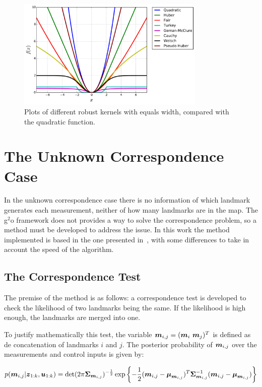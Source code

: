 \begin{figure}[htbp!]
    \centering
    \includegraphics[width=0.8\textwidth]{imagenes/kernels.pdf}
    \caption[Plots of different kernels.]{Plots of different robust kernels with equals width, compared with the quadratic function.}
    \label{fig:kernels}
\end{figure}

\section{The Unknown Correspondence Case}

In the unknown correspondence case there is no information of which landmark generates each measurement, neither of how many landmarks are in the map. The g$^2$o framework does not provides a way to solve the correspondence problem, so a method must be developed to address the issue. In this work the method implemented is based in the one presented in~\cite{graphslam}, with some differences to take in account the speed of the algorithm. 

\subsection{The Correspondence Test}

The premise of the method is as follows: a correspondence test is developed to check the likelihood of two landmarks being the same. If the likelihood is high enough, the landmarks are merged into one. 

To justify mathematically this test, the variable $\boldsymbol{m}_{i,j}=(\boldsymbol{m}_i~ \boldsymbol{m}_j)^T$ is defined as de concatenation of landmarks $i$ and $j$. The posterior probability of $\boldsymbol{m}_{i,j}$ over the measurements and control inputs is given by:

\begin{equation}
p(\boldsymbol{m}_{i,j}|\boldsymbol{z}_{1:k},\boldsymbol{u}_{1:k})=
\det(2\pi\boldsymbol{\Sigma}_{\boldsymbol{m}_{i,j}})^{-\frac{1}{2}}\exp\left\lbrace -\frac{1}{2}(\boldsymbol{m}_{i,j}-\boldsymbol{\mu}_{\boldsymbol{m}_{i,j}})^T
\boldsymbol{\Sigma}_{\boldsymbol{m}_{i,j}}^{-1}(\boldsymbol{m}_{i,j}-\boldsymbol{\mu}_{\boldsymbol{m}_{i,j}})\right\rbrace
\label{eq:concatenate}
\end{equation}

